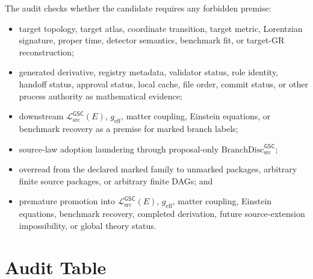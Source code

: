 \documentclass[11pt]{article}
\newcommand{\MetricData}{\mathcal{L}_{\mathrm{src}}^{\mathsf{GSC}}}
\newcommand{\geff}{g_{\mathrm{eff}}}
\newcommand{\BranchDisc}{\mathrm{BranchDisc}_{\mathrm{src}}^{\mathsf{GSC}}}
\begin{document}
The audit checks whether the candidate requires any forbidden premise:
\begin{itemize}[leftmargin=*]
  \item target topology, target atlas, coordinate transition, target metric,
  Lorentzian signature, proper time, detector semantics, benchmark fit, or
  target-GR reconstruction;
  \item generated derivative, registry metadata, validator status, role
  identity, handoff status, approval status, local cache, file order, commit
  status, or other process authority as mathematical evidence;
  \item downstream \(\MetricData(E)\), \(\geff\), matter coupling, Einstein
  equations, or benchmark recovery as a premise for marked branch labels;
  \item source-law adoption laundering through proposal-only \(\BranchDisc\);
  \item overread from the declared marked family to unmarked packages,
  arbitrary finite source packages, or arbitrary finite DAGs; and
  \item premature promotion into \(\MetricData(E)\), \(\geff\), matter
  coupling, Einstein equations, benchmark recovery, completed derivation,
  future source-extension impossibility, or global theory status.
\end{itemize}

\section{Audit Table}
\end{document}
